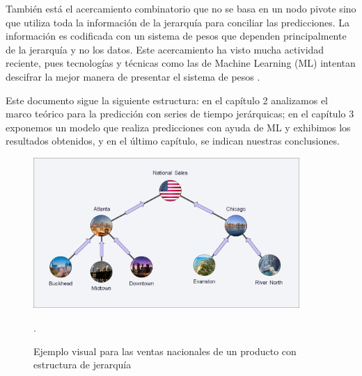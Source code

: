 También está el acercamiento combinatorio que no se basa en un nodo pivote sino que utiliza toda la información de la jerarquía para conciliar las predicciones. La información es codificada con un sistema de pesos que dependen principalmente de la jerarquía y no los datos. Este acercamiento ha visto mucha actividad reciente, pues tecnologías y técnicas como las de Machine Learning (ML) intentan descifrar la mejor manera de presentar el sistema de pesos \cite{abolghasemi2020model, abolghasemi2019machine, spiliotis2020hierarchical}.

Este documento sigue la siguiente estructura: en el capítulo 2 analizamos el marco teórico para la predicción con series de tiempo jerárquicas; en el capítulo 3 exponemos un modelo que realiza predicciones con ayuda de ML y exhibimos los resultados obtenidos, y en el último capítulo, se indican nuestras conclusiones.

\begin{figure}
    \centering
    \includegraphics[width=0.9\textwidth]{imgs/jerar1.png}
    \caption{Ejemplo visual para las ventas nacionales de un producto con estructura de jerarquía}.
    \label{fig:jerarquia_1}
\end{figure}